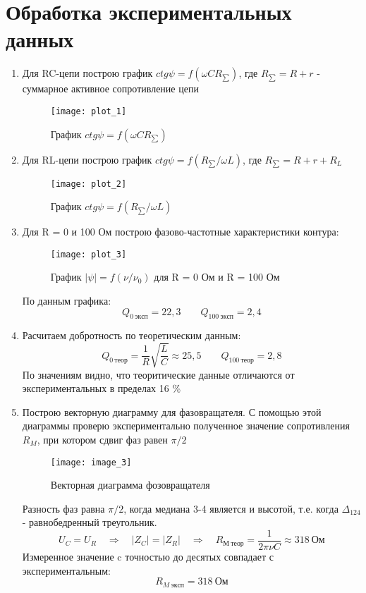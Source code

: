 \section*{Обработка экспериментальных данных}
\begin{enumerate}
	\item Для RC-цепи построю график $ctg \psi = f(\omega C R_{\sum})$, где $R_{\sum} = R + r$ - суммарное активное сопротивление цепи
	
	\begin{figure}[h!]
		\centering
		\texttt{[image: plot\_1]}
		\caption{График $ctg \psi = f(\omega C R_{\sum})$}
		\label{fig:plot_1}
	\end{figure}

	\newpage

	\item Для RL-цепи построю график $ctg \psi = f(R_{\sum} / \omega L)$, где $R_{\sum} = R + r + R_L$
	
	\begin{figure}[h!]
		\centering
		\texttt{[image: plot\_2]}
		\caption{График $ctg \psi = f(R_{\sum} / \omega L)$}
		\label{fig:plot_2}
	\end{figure}
	
	\item Для R = 0 и 100 Ом построю фазово-частотные характеристики контура:
	
	\begin{figure}[h!]
		\centering
		\texttt{[image: plot\_3]}
		\caption{График $|\psi| = f(\nu / \nu_0)$ для R = 0 Ом и R = 100 Ом}
		\label{fig:plot_3}
	\end{figure}

По данным графика: \\
\[
Q_{0 \ эксп} = 22,3 \quad \quad Q_{100\ эксп} = 2,4
\]

\item Расчитаем добротность по теоретическим данным:
\[
Q_{0 \ теор} = \frac{1}{R}\sqrt{\frac{L}{C}} \approx 25,5 \quad \quad Q_{100\ теор} = 2,8
\]
По значениям видно, что теоритические данные отличаются от экспериментальных в пределах 16 \%

\newpage
\item Построю векторную диаграмму для фазовращателя. С помощью этой диаграммы проверю экспериментально полученное  значение  сопротивления $R_M$,  при котором сдвиг фаз равен $\pi/2$

\begin{figure}[h!]
	\centering
	\texttt{[image: image\_3]}
	\caption{Векторная диаграмма фозовращателя}
	\label{fig:image_3}
\end{figure}
Разность фаз равна $\pi/2$, когда медиана 3-4 является и высотой, т.е. когда $\Delta_{124}$ - равнобедренный треугольник. \\
\[
U_C = U_R \quad \Rightarrow \quad |Z_C| = |Z_R| \quad \Rightarrow \quad R_{М \ теор} = \frac{1}{2 \pi \nu C} \approx 318 \ Ом
\]
Измеренное значение c точностью до десятых совпадает с экспериментальным:
$$
R_{M \ эксп} = 318 \ Ом
$$


\end{enumerate}
